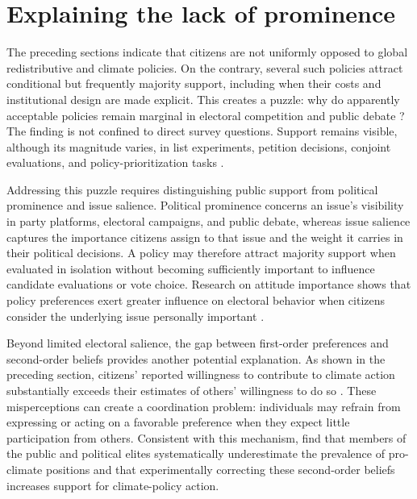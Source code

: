 \section{Explaining the lack of prominence}

The preceding sections indicate that citizens are not uniformly opposed to global redistributive and climate policies. %
On the contrary, several such policies attract conditional but frequently majority support, including when their costs and institutional design are made explicit. This creates a %
puzzle: why do apparently acceptable policies remain marginal in electoral competition and public debate \citep{fabre_majority_2025,fabre_public_2026}? The finding is not confined to direct survey questions. Support remains visible, although its magnitude varies, in list experiments, petition decisions, conjoint evaluations, and policy-prioritization tasks \citep{fabre_majority_2025}.

Addressing this puzzle requires distinguishing public support from political prominence and issue salience. Political prominence concerns an issue's visibility in party platforms, electoral campaigns, and public debate, whereas issue salience captures the importance citizens assign to that issue and the weight it carries in their political decisions. A policy may therefore attract majority support when evaluated in isolation without becoming sufficiently important to influence candidate evaluations or vote choice. Research on attitude importance shows that policy preferences exert greater influence on electoral behavior when citizens consider the underlying issue personally important \citep{krosnick_role_1988,dennison_review_2019}.

Beyond limited electoral salience, %
the gap between first-order preferences and second-order beliefs provides another potential explanation. As shown in the preceding section, citizens' reported willingness to contribute to climate action substantially exceeds their estimates of others' willingness to do so \citep{andre_globally_2024}. These misperceptions can create a coordination problem: individuals may refrain from expressing or acting on a favorable preference when they expect little participation from others. Consistent with this mechanism, \citet{mildenberger_beliefs_2017} find that members of the public and political elites systematically underestimate the prevalence of pro-climate positions and that experimentally correcting these second-order beliefs increases support for climate-policy action.

